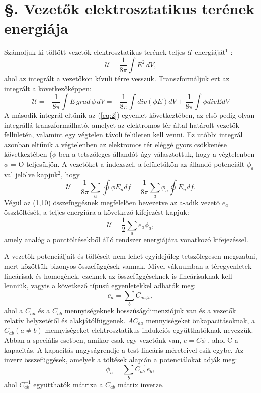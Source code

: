 \documentclass{article}
\begin{document}
\section{§. Vezetők elektrosztatikus terének energiája}
Számoljuk ki töltött vezetők elektrosztatikus terének teljes $\mathcal{U}$ energiáját$^1$ :
\begin{equation} \label{eq:1}
    \mathcal{U} = \frac{1}{8\pi} \int E^2 \, dV,
\end{equation}
ahol az integrált a vezetőkön kívüli térre vesszük. Transzformáljuk ezt az integrált a következőképpen:
\begin{equation} \label{eq:2}
    \mathcal{U} = -\frac{1}{8\pi} \int E \, grad \, \phi \, dV = -\frac{1}{8\pi} \int div (\phi E) dV + \frac{1}{8\pi} \int \phi div E dV
\end{equation}
A második integrál eltűnik az (\ref{eq:2}) egyenlet következtében, az első pedig olyan integrállá transzformálható, amelyet az elektromos tér által határolt vezetők fellületén, valamint egy végtelen távoli felületen kell venni. Ez utóbbi integrál azonban eltűnik a végtelenben az elektromos tér eléggé gyors csökkenése következtében ($\phi$-ben a tetszőleges állandót úgy választottuk, hogy a végtelenben $\phi$ = O teljesüljön. A vezetőket a indexszel, a felületükön az állandó potenciált $\phi_a$-val jelölve kapjuk$^2$, hogy
\begin{equation} \label{eq:3}
    \mathcal{U} = \frac{1}{8\pi} \sum\limits_{a} \oint \phi E_n df = \frac{1}{8\pi} \sum\limits_{a} \phi_a \oint E_n df.
\end{equation}
Végül az (1,10) összefüggésnek megfelelően bevezetve az a-adik vezetö $e_a$ össztöltését, a teljes energiára a következő kifejezést kapjuk:
\begin{equation} \label{eq:4}
    \mathcal{U} = \frac{1}{2} \sum\limits_{a} e_a \phi_a ,
\end{equation}
amely analóg a ponttöltésekből álló rendszer energiájára vonatkozó kifejezéssel.

A vezetők potenciáljait és töltéseit nem lehet egyidejűleg tetszőlegesen megszabni, mert közöttük bizonyos összefüggések vannak. Mivel vákuumban a téregyenletek lineárisak és homogének, ezeknek az összefüggéseknek is lineárisaknak kell lenniük, vagyis a következő típusú egyenletekkel adhatók meg:
\begin{equation} \label{eq:5}
    e_a = \sum\limits_{b} C_{ab\phi b} ,
\end{equation}
ahol a $C_{aa}$ és a $C_{ab}$ mennyiségeknek hosszúságdimenziójuk van és a vezetők relatív helyzetétől és alakjátólfüggenek. $AC_{aa}$ mennyiségeket önkapacitásoknak, a $C_{ab}(a \neq b)$ mennyiségeket elektrosztatikus indukciós együtthatóknak nevezzük. Abban a
speciális esetben, amikor csak egy vezetőnk van, $e = C\phi$ , ahol C a kapacitás. A kapacitás nagyságrendje a test lineáris méreteivel esik egybe. Az inverz összefüggések, amelyek a töltések alapián a potenciálokat adják meg:
\begin{equation} \label{eq:6}
    \phi_a = \sum\limits_{b} C_{ab}^{-1} e_b ,
\end{equation}
ahol $C_{ab}^{-1}$ együtthatók mátrixa a $C_{ab}$ mátrix inverze.
\end{document}
